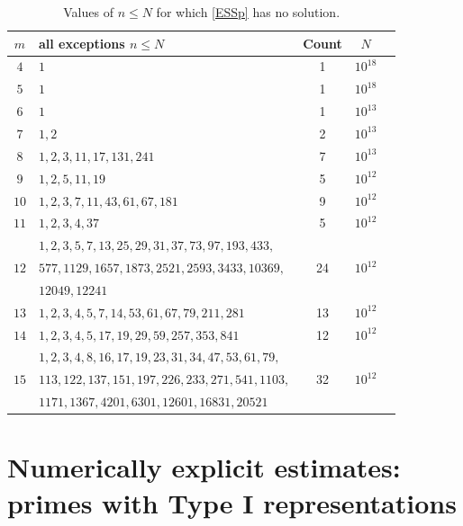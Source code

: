 \documentclass[12pt]{amsart}
\theoremstyle{definition}
\theoremstyle{remark}
\numberwithin{equation}{section}
\begin{document}
\begin{table}[h]\label{table1}
 \begin{tabular}{ | c | l | c | c | c |}
    \hline
$m $ & all exceptions $n\le N$ & Count & $N$ \\ \hline
$4$ & $1$ & 1 & $10^{18}$ \cite{MD} \\ \hline
$5$ & $1$ & 1 & $10^{18}$ \\ \hline
$6$ & $1$ & 1 & $10^{13}$ \\ \hline
$7$ & $1, 2$ & 2 & $10^{13}$ \\ \hline
$8$ & $1, 2, 3, 11, 17, 131, 241$ &  7  & $10^{13}$ \\ \hline
$9$ & $1, 2, 5, 11, 19$ &  5 & $10^{12}$ \\ \hline
$10$ & $1, 2, 3, 7, 11, 43, 61, 67, 181$ & 9 & $10^{12}$ \\ \hline
$11$ & $1, 2, 3, 4, 37$ &  5 & $10^{12}$ \\ \hline
 & $1, 2, 3, 5, 7, 13, 25, 29, 31, 37, 73, 97, 193, 433,$ & &\\ 
$12$& $ 577,1129,1657, 1873, 2521, 2593, 3433, 10369,$ & 24 & $10^{12}$ \\ 
& $12049, 12241$ & &\\ \hline
$13$ & $1, 2, 3, 4, 5, 7, 14, 53, 61, 67, 79, 211, 281$ &  13 & $ 10^{12}$ \\ \hline
$14$ & $1, 2, 3, 4, 5, 17, 19, 29, 59, 257, 353, 841$ &  12 & $10^{12}$\\ \hline
 & $1, 2, 3, 4, 8, 16, 17, 19, 23, 31, 34, 47, 53,61,79,$ &  &  \\ 
$15$& $113,122, 137,151,197,226,233,271,541,1103,$ & 32 & $10^{12}$ \\
& $1171,1367,4201,6301, 12601,16831,20521$ & &\\ \hline
     \end{tabular}
\medskip
\caption{Values of $n\le N$ for which \eqref{ESSp} has no solution. }
\end{table}

\section{Numerically explicit estimates: primes with Type I representations}
\label{secI}
\end{document}
